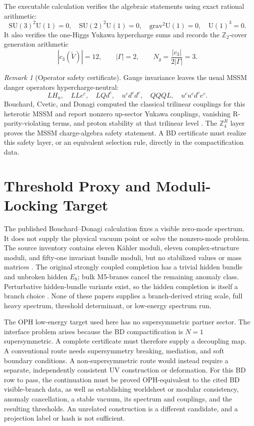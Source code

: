 \documentclass[11pt]{article}
\theoremstyle{remark}
\newtheorem{remark}[theorem]{Remark}
\theoremstyle{plain}
\newcommand{\SU}{\mathrm{SU}}
\newcommand{\U}{\mathrm{U}}
\newcommand{\Z}{\mathbb Z}
\newcommand{\ZfourR}{\mathbb Z_4^R}
\begin{document}
The executable calculation verifies the algebraic statements using exact rational arithmetic:
\[
\SU(3)^2\U(1)=0,\quad
\SU(2)^2\U(1)=0,\quad
\mathrm{grav}^2\U(1)=0,\quad
\U(1)^3=0.
\]
It also verifies the one-Higgs Yukawa hypercharge sums and records the \(\Z_2\)-cover generation
arithmetic
\[
|c_3(\widetilde V)|=12,\qquad |\Gamma|=2,\qquad
N_g=\frac{|c_3|}{2|\Gamma|}=3.
\]

\begin{remark}[Operator safety certificate]
Gauge invariance leaves the usual MSSM danger operators hypercharge-neutral:
\[
LH_u,\quad LLe^c,\quad LQd^c,\quad u^cd^cd^c,\quad QQQL,\quad u^cu^cd^ce^c.
\]
Bouchard, Cvetic, and Donagi computed the classical trilinear couplings for this heterotic MSSM
and report nonzero up-sector Yukawa couplings, vanishing R-parity-violating terms, and proton
stability at that trilinear level \cite{BouchardCveticDonagi2006}. The \(\ZfourR\) layer proves
the MSSM charge-algebra safety statement. A BD certificate must realize this safety layer, or an
equivalent selection rule, directly in the compactification data.
\end{remark}

\section{Threshold Proxy and Moduli-Locking Target}\label{sec:bd-threshold-proxy}

The published Bouchard--Donagi calculation fixes a visible zero-mode spectrum. It does not supply
the physical vacuum point or solve the nonzero-mode problem. The source inventory contains eleven
K\"ahler moduli, eleven complex-structure moduli, and fifty-one invariant bundle moduli, but no
stabilized values or mass matrices \cite{BouchardCveticDonagi2006,BouchardDonagi2008}. The
original strongly coupled completion has a trivial hidden bundle and unbroken hidden \(E_8\);
bulk M5-branes cancel the remaining anomaly class. Perturbative hidden-bundle variants exist, so
the hidden completion is itself a branch choice \cite{BouchardDonagi2005,BouchardDonagi2008}.
None of these papers supplies a
branch-derived string scale, full heavy spectrum, threshold determinant, or low-energy spectrum
run.

The OPH low-energy target used here has no supersymmetric partner sector. The interface problem
arises because the BD compactification is \(N=1\) supersymmetric. A complete certificate must
therefore supply a decoupling map. A conventional route needs supersymmetry breaking, mediation,
and soft boundary conditions. A non-supersymmetric route would instead require a separate,
independently consistent UV construction or deformation. For this BD row to pass, the
continuation must be proved OPH-equivalent to the cited BD visible-branch data, as well as
establishing worldsheet or modular consistency, anomaly cancellation, a stable vacuum, its
spectrum and couplings, and the resulting thresholds. An unrelated construction is a different
candidate, and a projection label or hash is not sufficient.
\end{document}
